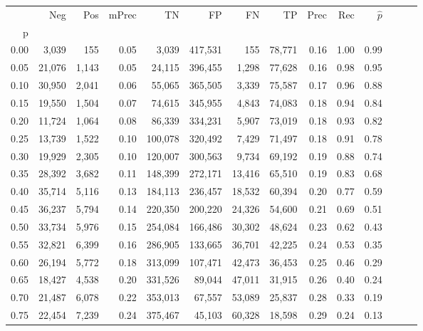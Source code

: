 \begin{tabular}{rrrrrrrrrrrrrr}
\toprule
{} &     Neg &    Pos & mPrec &       TN &       FP &      FN &      TP &  Prec &   Rec & $\hat{p}$ \\
p    &         &        &       &          &          &         &         &       &       &           \\
\midrule
0.00 &   3,039 &    155 &  0.05 &    3,039 &  417,531 &     155 &  78,771 &  0.16 &  1.00 &      0.99 \\
0.05 &  21,076 &  1,143 &  0.05 &   24,115 &  396,455 &   1,298 &  77,628 &  0.16 &  0.98 &      0.95 \\
0.10 &  30,950 &  2,041 &  0.06 &   55,065 &  365,505 &   3,339 &  75,587 &  0.17 &  0.96 &      0.88 \\
0.15 &  19,550 &  1,504 &  0.07 &   74,615 &  345,955 &   4,843 &  74,083 &  0.18 &  0.94 &      0.84 \\
0.20 &  11,724 &  1,064 &  0.08 &   86,339 &  334,231 &   5,907 &  73,019 &  0.18 &  0.93 &      0.82 \\
0.25 &  13,739 &  1,522 &  0.10 &  100,078 &  320,492 &   7,429 &  71,497 &  0.18 &  0.91 &      0.78 \\
0.30 &  19,929 &  2,305 &  0.10 &  120,007 &  300,563 &   9,734 &  69,192 &  0.19 &  0.88 &      0.74 \\
0.35 &  28,392 &  3,682 &  0.11 &  148,399 &  272,171 &  13,416 &  65,510 &  0.19 &  0.83 &      0.68 \\
0.40 &  35,714 &  5,116 &  0.13 &  184,113 &  236,457 &  18,532 &  60,394 &  0.20 &  0.77 &      0.59 \\
0.45 &  36,237 &  5,794 &  0.14 &  220,350 &  200,220 &  24,326 &  54,600 &  0.21 &  0.69 &      0.51 \\
0.50 &  33,734 &  5,976 &  0.15 &  254,084 &  166,486 &  30,302 &  48,624 &  0.23 &  0.62 &      0.43 \\
0.55 &  32,821 &  6,399 &  0.16 &  286,905 &  133,665 &  36,701 &  42,225 &  0.24 &  0.53 &      0.35 \\
0.60 &  26,194 &  5,772 &  0.18 &  313,099 &  107,471 &  42,473 &  36,453 &  0.25 &  0.46 &      0.29 \\
0.65 &  18,427 &  4,538 &  0.20 &  331,526 &   89,044 &  47,011 &  31,915 &  0.26 &  0.40 &      0.24 \\
0.70 &  21,487 &  6,078 &  0.22 &  353,013 &   67,557 &  53,089 &  25,837 &  0.28 &  0.33 &      0.19 \\
0.75 &  22,454 &  7,239 &  0.24 &  375,467 &   45,103 &  60,328 &  18,598 &  0.29 &  0.24 &      0.13 \\

\end{tabular}

